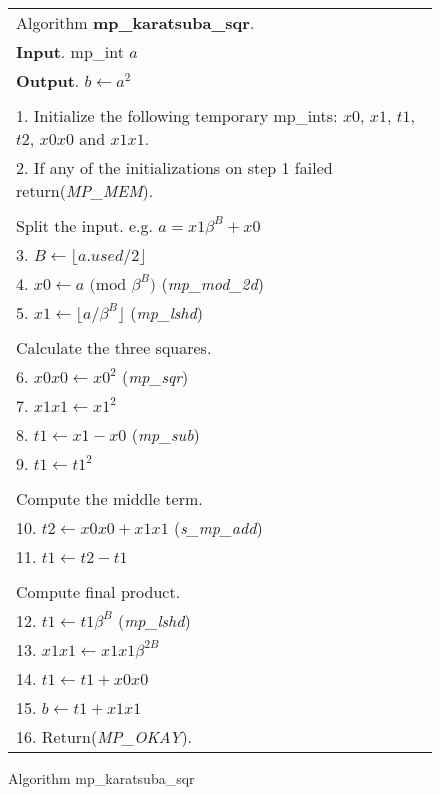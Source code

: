 \documentclass[b5paper]{book}
\begin{document}
\newpage\begin{figure}[!here]
\begin{small}
\begin{center}
\begin{tabular}{l}
\hline Algorithm \textbf{mp\_karatsuba\_sqr}. \\
\textbf{Input}.   mp\_int $a$ \\
\textbf{Output}.  $b \leftarrow a^2$ \\
\hline \\
1.  Initialize the following temporary mp\_ints:  $x0$, $x1$, $t1$, $t2$, $x0x0$ and $x1x1$. \\
2.  If any of the initializations on step 1 failed return(\textit{MP\_MEM}). \\
\\
Split the input.  e.g. $a = x1\beta^B + x0$ \\
3.  $B \leftarrow \lfloor a.used / 2 \rfloor$ \\
4.  $x0 \leftarrow a \mbox{ (mod }\beta^B\mbox{)}$ (\textit{mp\_mod\_2d}) \\
5.  $x1 \leftarrow \lfloor a / \beta^B \rfloor$ (\textit{mp\_lshd}) \\
\\
Calculate the three squares. \\
6.  $x0x0 \leftarrow x0^2$ (\textit{mp\_sqr}) \\
7.  $x1x1 \leftarrow x1^2$ \\
8.  $t1 \leftarrow x1 - x0$ (\textit{mp\_sub}) \\
9.  $t1 \leftarrow t1^2$ \\
\\
Compute the middle term. \\
10.  $t2 \leftarrow x0x0 + x1x1$ (\textit{s\_mp\_add}) \\
11.  $t1 \leftarrow t2 - t1$ \\
\\
Compute final product. \\
12.  $t1 \leftarrow t1\beta^B$ (\textit{mp\_lshd}) \\
13.  $x1x1 \leftarrow x1x1\beta^{2B}$ \\
14.  $t1 \leftarrow t1 + x0x0$ \\
15.  $b \leftarrow t1 + x1x1$ \\
16.  Return(\textit{MP\_OKAY}). \\
\hline
\end{tabular}
\end{center}
\end{small}
\caption{Algorithm mp\_karatsuba\_sqr}
\end{figure}
\end{document}
